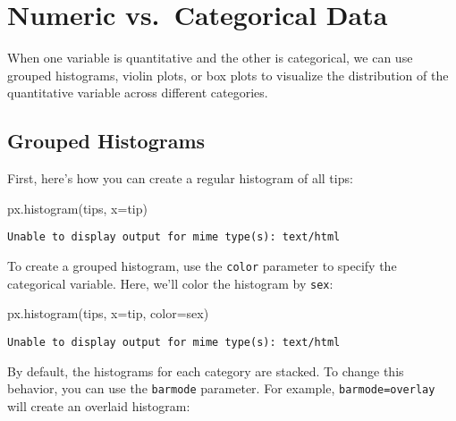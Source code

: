 \documentclass[
  letterpaper,
  DIV=11,
  numbers=noendperiod]{scrreprt}
\newenvironment{Shaded}{\begin{snugshade}}{\end{snugshade}}
\newcommand{\NormalTok}[1]{\textcolor[rgb]{0.00,0.23,0.31}{#1}}
\newcommand{\OperatorTok}[1]{\textcolor[rgb]{0.37,0.37,0.37}{#1}}
\newcommand{\StringTok}[1]{\textcolor[rgb]{0.13,0.47,0.30}{#1}}
\begin{document}
\section{Numeric vs.~Categorical
Data}\label{numeric-vs.-categorical-data}

When one variable is quantitative and the other is categorical, we can
use grouped histograms, violin plots, or box plots to visualize the
distribution of the quantitative variable across different categories.

\subsection{Grouped Histograms}\label{grouped-histograms}

First, here's how you can create a regular histogram of all tips:

\begin{Shaded}
\begin{Highlighting}[]
\NormalTok{px.histogram(tips, x}\OperatorTok{=}\StringTok{\textquotesingle{}tip\textquotesingle{}}\NormalTok{)}
\end{Highlighting}
\end{Shaded}

\begin{verbatim}
Unable to display output for mime type(s): text/html
\end{verbatim}

To create a grouped histogram, use the \texttt{color} parameter to
specify the categorical variable. Here, we'll color the histogram by
\texttt{sex}:

\begin{Shaded}
\begin{Highlighting}[]
\NormalTok{px.histogram(tips, x}\OperatorTok{=}\StringTok{\textquotesingle{}tip\textquotesingle{}}\NormalTok{, color}\OperatorTok{=}\StringTok{\textquotesingle{}sex\textquotesingle{}}\NormalTok{)}
\end{Highlighting}
\end{Shaded}

\begin{verbatim}
Unable to display output for mime type(s): text/html
\end{verbatim}

By default, the histograms for each category are stacked. To change this
behavior, you can use the \texttt{barmode} parameter. For example,
\texttt{barmode=\textquotesingle{}overlay\textquotesingle{}} will create
an overlaid histogram:
\end{document}
